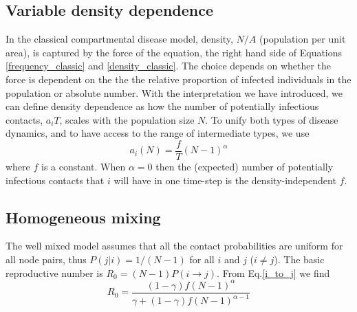 \documentclass[10pt]{article}
\begin{document}
\begin{multicols}{2}
\subsection{Variable density dependence}
In the classical compartmental disease model, density, $N/A$ (population per unit area), is captured by the force of the equation, the right hand side of Equations \eqref{frequency_classic} and \eqref{density_classic}. The choice depends on whether the force is dependent on the the the relative proportion of infected individuals in the population or absolute number. With the interpretation we have introduced, we can define density dependence as how the number of potentially infectious contacts, $a_{i}T$, scales with the population size $N$. To unify both types of disease dynamics, and to have access to the range of intermediate types, we use
\begin{equation}
a_{i}(N)=\frac{f}{T}(N-1)^{\alpha}
\end{equation}
where $f$ is a constant. When $\alpha=0$ then the (expected) number of potentially infectious contacts that $i$ will have in one time-step is the density-independent $f$. 
\subsection{Homogeneous mixing}
The well mixed model assumes that all the contact probabilities are uniform for all node pairs, thus $P(j|i)=1/(N-1)$ for all $i$ and $j$ ($i\neq j$). The basic reproductive number is $R_{0}=(N-1)P(i\rightarrow j)$. From Eq.\eqref{i_to_j} we find  
\begin{equation}
R_{0}=\frac{(1-\gamma)f(N-1)^{\alpha}}{\gamma+(1-\gamma)f(N-1)^{\alpha-1}}
\end{equation}


\end{multicols}
\end{document}
